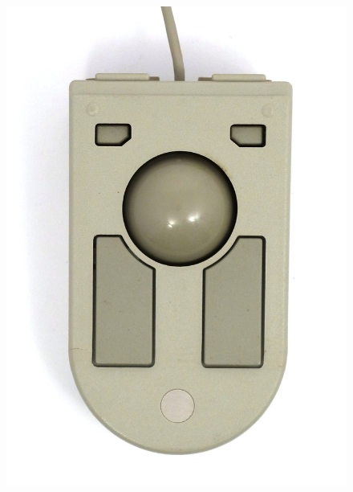 \documentclass[11pt, a4paper]{article}
\begin{document}
\begin{figure}[h]
    \centering
    \includegraphics[scale=0.56]{1992_ibm_convertible/top_60.jpg}

\end{figure}
\end{document}
